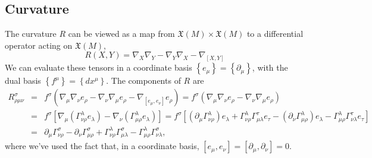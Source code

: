 \documentclass[aps,prb,superscriptaddress,nofootinbib]{revtex4}
\begin{document}
\subsection{Curvature}
The curvature $R$ can be viewed as a map from $\mathfrak{X}(M) \times \mathfrak{X}(M)$ to a differential operator acting on $\mathfrak{X}(M)$,
\begin{equation}
	R(X, Y) = \nabla_X \nabla_Y-\nabla_Y \nabla_X-\nabla_{[X, Y]}
\end{equation}
We can evaluate these tensors in a coordinate basis $\left\{e_\mu\right\}=\left\{\partial_\mu\right\}$, with the dual basis $\left\{f^\mu\right\}=\left\{d x^\mu\right\}$. The components of $R$ are
\begin{eqnarray}
	R_{\rho \mu \nu}^\sigma 
	&=&f^\sigma\left(\nabla_\mu \nabla_\nu e_\rho-\nabla_\nu \nabla_\mu e_\rho-\nabla_{\left[e_\mu, e_\nu\right]} e_\rho\right)
 	=f^\sigma\left(\nabla_\mu \nabla_\nu e_\rho-\nabla_\nu \nabla_\mu e_\rho\right) \nonumber \\
	&=&f^\sigma\left[\nabla_\mu\left(\Gamma_{\nu \rho}^\lambda e_\lambda\right)-\nabla_\nu\left(\Gamma_{\mu \rho}^\lambda e_\lambda\right)\right] 
	=f^\sigma\left[\left(\partial_\mu \Gamma_{\nu \rho}^\lambda\right) e_\lambda+\Gamma_{\nu \rho}^\lambda \Gamma_{\mu \lambda}^\tau e_\tau-\left(\partial_\nu \Gamma_{\mu \rho}^\lambda\right) e_\lambda-\Gamma_{\mu \rho}^\lambda \Gamma_{\nu \lambda}^\tau e_\tau\right] \nonumber \\
	&=&\partial_\mu \Gamma_{\nu \rho}^\sigma-\partial_\nu \Gamma_{\mu \rho}^\sigma+\Gamma_{\nu \rho}^\lambda \Gamma_{\mu \lambda}^\sigma-\Gamma_{\mu \rho}^\lambda \Gamma_{\nu \lambda}^\sigma, \label{eq:Reimann-tensor}
\end{eqnarray}
where we've used the fact that, in a coordinate basis, $\left[e_\mu, e_\nu\right]=\left[\partial_\mu, \partial_\nu\right]=0$. 
\end{document}
